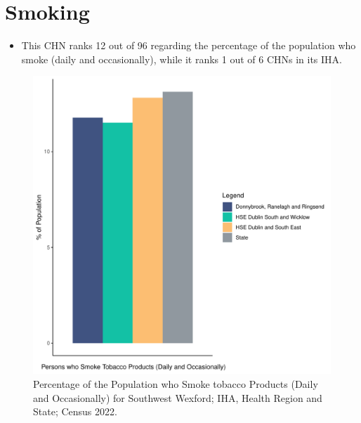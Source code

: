 \documentclass{article}
\begin{document}
\pagebreak

\section{Smoking}\label{sect:Smoking}
\begin{itemize}
\item This CHN ranks  12 out of 96 regarding the percentage of the population who smoke (daily and occasionally), while it ranks   1 out of 6 CHNs in its IHA.
\end{itemize}
\begin{figure}[H]
	\centering
	\includegraphics[width = 120mm]{../figures/SmokingED.pdf}
	\caption{Percentage of the Population who Smoke tobacco Products (Daily and Occasionally) for Southwest Wexford; IHA, Health Region and State; Census 2022.}
	\label{fig:2ae19629-1a6a-13a3-e055-000000000001}
	\end{figure}
	
\end{document}
